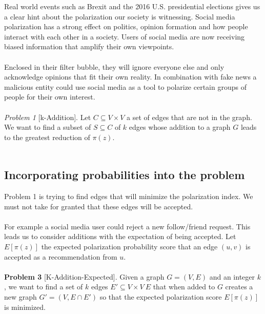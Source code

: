 Real world events such as Brexit and the 2016 U.S. presidential elections gives us a clear hint about the polarization our society is witnessing. Social media polarization has a strong effect on politics, opinion formation and how people interact with each other in a society. Users of social media are now receiving biased information that amplify their own viewpoints. 
\\
\\
Enclosed in their filter bubble, they will ignore everyone else and only acknowledge opinions that fit their own reality. In combination with fake news a malicious entity could use social media as a tool to polarize certain groups of people for their own interest. 
\\
\\
\textit{Problem 1} [k-Addition]. Let $C \subseteq	V \times V$ a set of edges that are not in the graph. We want to find a subset of $S \subseteq C$ of $k$ edges whose addition to a graph $G$ leads to the greatest reduction of $\pi(z)$.
\\
\\

\clearpage

\subsection{Incorporating probabilities into the problem}
\label{sec:probabilityProbDef}

Problem 1 is trying to find edges that will minimize the polarization index. We must not take for granted that these edges will be accepted. 
\\
\\
For example a social media user could reject a new follow/friend request. This leads us to consider additions with the expectation of being accepted. Let $E[\pi(z)]$ the expected polarization probability score that an edge $(u, v)$ is accepted as a recommendation from $u$.
\\
\\
\textbf{Problem 3} [K-Addition-Expected]. Given a graph $G=(V,E)$ and an integer $k$, we want to find a set of $k$ edges $E′ \subseteq V×V \ E$ that when added to $G$ creates a new graph $G' = (V,E \cap E')$ so that the expected polarization score $E[\pi(z)]$ is minimized.
\\
\\

\clearpage




